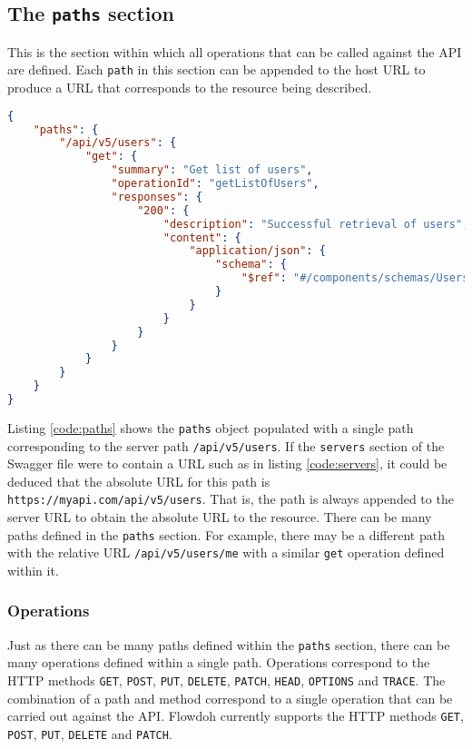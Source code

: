\subsection{The \texttt{paths} section}
This is the section within which all operations that can be called against the API are defined. Each \texttt{path} in this section can be appended to the host URL to produce a URL that corresponds to the resource being described.\\
\begin{minipage}{\textwidth}
\begin{lstlisting}[caption={The \texttt{paths} object},label={code:paths},language=json]
{
    "paths": {
        "/api/v5/users": {
            "get": {
                "summary": "Get list of users",
                "operationId": "getListOfUsers",
                "responses": {
                    "200": {
                        "description": "Successful retrieval of users",
                        "content": {
                            "application/json": {
                                "schema": {
                                    "$ref": "#/components/schemas/UsersList"
                                }
                            }
                        }
                    }
                }
            }
        }
    }
}
\end{lstlisting}
\end{minipage}
Listing \ref{code:paths} shows the \texttt{paths} object populated with a single path corresponding to the server path \texttt{/api/v5/users}. If the \texttt{servers} section of the Swagger file were to contain a URL such as in listing \ref{code:servers}, it could be deduced that the absolute URL for this path is \texttt{https://myapi.com/api/v5/users}. That is, the path is always appended to the server URL to obtain the absolute URL to the resource. There can be many paths defined in the \texttt{paths} section. For example, there may be a different path with the relative URL \texttt{/api/v5/users/me} with a similar \texttt{get} operation defined within it.
\subsubsection{Operations}
\label{subsubsec:operations}
Just as there can be many paths defined within the \texttt{paths} section, there can be many operations defined within a single path. Operations correspond to the HTTP methods \texttt{GET}, \texttt{POST}, \texttt{PUT}, \texttt{DELETE}, \texttt{PATCH}, \texttt{HEAD}, \texttt{OPTIONS} and \texttt{TRACE}. The combination of a path and method correspond to a single operation that can be carried out against the API. Flowdoh currently supports the HTTP methods \texttt{GET}, \texttt{POST}, \texttt{PUT}, \texttt{DELETE} and \texttt{PATCH}.

